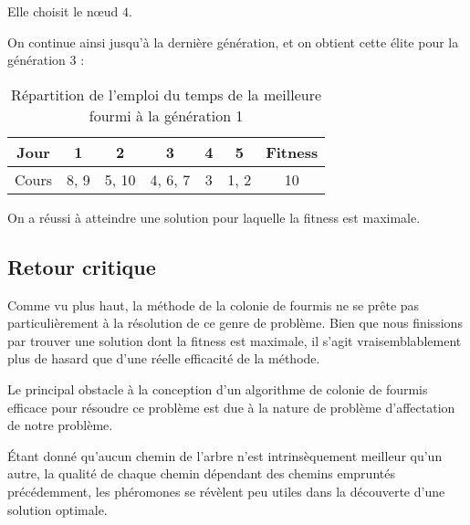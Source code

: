 Elle choisit le n\oe ud $4$.

On continue ainsi jusqu'à la dernière génération, et on obtient cette élite pour la génération 3 :

\begin{table}[!h]
    \centering
    \begin{tabular}{|c|c|c|c|c|c|c|}
        \hline
        Jour  & 1    & 2     & 3       & 4 & 5    & Fitness \\
        \hline
        Cours & 8, 9 & 5, 10 & 4, 6, 7 & 3 & 1, 2 & 10      \\
        \hline
    \end{tabular}
    \caption{Répartition de l'emploi du temps de la meilleure fourmi à la génération 1}\label{tab:voeux-etudiant-7}
\end{table}

On a réussi à atteindre une solution pour laquelle la fitness est maximale.

\subsection{Retour critique}\label{subsec:retour-critique}

Comme vu plus haut, la méthode de la colonie de fourmis ne se prête pas particulièrement à la résolution de ce genre de problème.
Bien que nous finissions par trouver une solution dont la fitness est maximale, il s'agit vraisemblablement plus de hasard que d'une réelle efficacité de la méthode.

Le principal obstacle à la conception d'un algorithme de colonie de fourmis efficace pour résoudre ce problème est due à la nature de problème d'affectation de notre problème.

Étant donné qu'aucun \og chemin \fg{} de l'arbre n'est intrinsèquement meilleur qu'un autre, la qualité de chaque chemin dépendant des chemins empruntés précédemment, les phéromones se révèlent peu utiles dans la découverte d'une solution optimale.